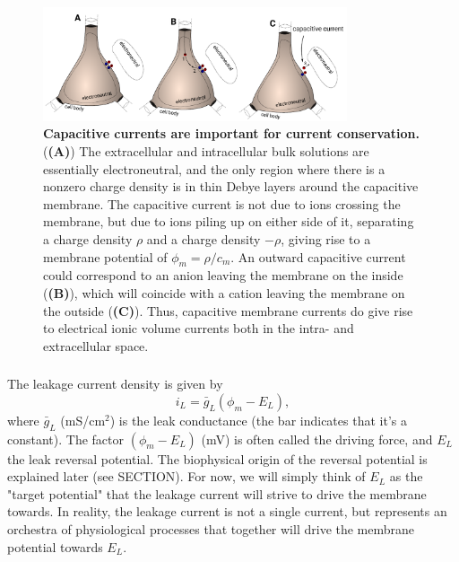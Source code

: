 \begin{figure}[!ht]
\begin{center}
\includegraphics[width=0.8\textwidth]{Figures/Neuron/capacitive_currents.pdf}
\end{center}
\caption{\textbf{Capacitive currents are important for current conservation.}  (\textbf{(A)}) The extracellular and intracellular bulk solutions are essentially electroneutral, and the only region where there is a nonzero charge density is in thin Debye layers around the capacitive membrane. The capacitive current is not due to ions crossing the membrane, but due to ions piling up on either side of it, separating a charge density $\rho$ and a charge density $-\rho$, giving rise to a membrane potential of $\phi_m = \rho/c_m$. An outward capacitive current could correspond to an anion leaving the membrane on the inside (\textbf{(B)}), which will coincide with a cation leaving the membrane on the outside (\textbf{(C)}). Thus, capacitive membrane currents do give rise to electrical ionic volume currents both in the intra- and extracellular space.
}
\label{Neuron:fig:capacitive_currents}
\end{figure}


\subsubsection{}
The leakage current density is given by
\begin{equation}
i_L = \bar{g}_L (\phi_m - E_L),
\label{eq:HHleak}
\end{equation}
where $\bar{g}_L$ (mS/cm$^2$) is the leak conductance (the bar indicates that it's a constant). The factor $(\phi_m - E_L)$ (mV) is often called the driving force, and $E_L$ the leak reversal potential. The biophysical origin of the reversal potential is explained later (see SECTION). For now, we will simply think of $E_L$ as the "target potential" that the leakage current will strive to drive the membrane towards. In reality, the leakage current is not a single current, but represents an orchestra of physiological processes that together will drive the membrane potential towards $E_L$. 

